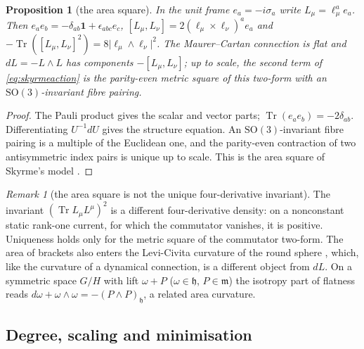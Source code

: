 \documentclass[aps,pra,onecolumn,superscriptaddress,nofootinbib,10pt]{revtex4-2}
\newtheorem{proposition}[theorem]{Proposition}
\theoremstyle{definition}
\theoremstyle{remark}
\newtheorem{remark}[theorem]{Remark}
\newcommand{\tr}{\operatorname{Tr}}
\newcommand{\SO}{\mathrm{SO}}
\begin{document}
\begin{proposition}[the area square]\label{prop:areasq}
In the unit frame $e_a=-i\sigma_a$ write $L_\mu=\ell_\mu^ae_a$.  Then $e_ae_b=-\delta_{ab}\mathbf1+\epsilon_{abc}e_c$,
$[L_\mu,L_\nu]=2(\ell_\mu\times\ell_\nu)^ae_a$ and $-\tr([L_\mu,L_\nu]^2)=8\lvert\ell_\mu\wedge\ell_\nu\rvert^2$.  The Maurer--Cartan connection is flat
and $dL=-L\wedge L$ has components $-[L_\mu,L_\nu]$; up to scale, the second term of \eqref{eq:skyrmeaction} is the
parity-even metric square of this two-form with an $\SO(3)$-invariant fibre pairing.
\end{proposition}
\begin{proof}
The Pauli product gives the scalar and vector parts; $\tr(e_ae_b)=-2\delta_{ab}$.  Differentiating $U^{-1}dU$ gives the
structure equation.  An $\SO(3)$-invariant fibre pairing is a multiple of the Euclidean one, and the parity-even
contraction of two antisymmetric index pairs is unique up to scale.  This is the area square of Skyrme's
model \cite{n6:skyrme}.
\end{proof}
\begin{remark}[the area square is not the unique four-derivative invariant]\label{rem:notunique}
The invariant $(\tr L_\mu L^\mu)^2$ is a different four-derivative density: on a nonconstant static rank-one
current, for which the commutator vanishes, it is positive.  Uniqueness holds only for the metric square
of the commutator two-form.  The area of brackets also enters the Levi-Civita curvature of the round
sphere \cite[Prop.~5.4, Thm.~9.12]{PaperI}, which, like the curvature of a dynamical connection, is a
different object from $dL$.  On a symmetric space $G/H$ with lift $\omega+P$ ($\omega\in\mathfrak h$, $P\in\mathfrak m$) the isotropy
part of flatness reads $d\omega+\omega\wedge\omega=-(P\wedge P)_{\mathfrak h}$, a related area curvature.
\end{remark}

\subsection{Degree, scaling and minimisation}
\end{document}
